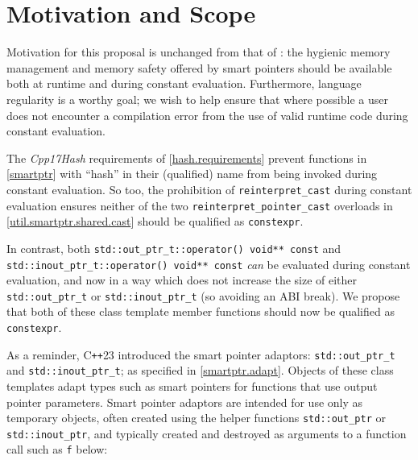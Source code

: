 \documentclass[10pt]{article}
\newcommand*{\wgxxi}[1]{[\href{https://wg21.link/#1}{#1}]}
\newcommand*{\Cpp}{C\texttt{++}}
\begin{document}

\section{Motivation and Scope}

Motivation for this proposal is unchanged from that of \cite{P3037R6}: the
hygienic memory management and memory safety offered by smart pointers should
be available both at runtime and during constant evaluation. Furthermore,
language regularity is a worthy goal; we wish to help ensure that where
possible a user does not encounter a compilation error from the use of valid
runtime code during constant evaluation.

The \emph{Cpp17Hash} requirements of \wgxxi{hash.requirements} prevent
functions in \wgxxi{smartptr} with ``hash'' in their (qualified) name from
being invoked during constant evaluation. So too, the prohibition of
\texttt{reinterpret\_cast} during constant evaluation ensures neither of the
two \texttt{reinterpret\_pointer\_cast} overloads in
\wgxxi{util.smartptr.shared.cast} should be qualified as \texttt{constexpr}.

In contrast, both \texttt{std::out\_ptr\_t::operator() void** const} and
\texttt{std::inout\_ptr\_t::operator() void** const} \emph{can} be
evaluated during constant evaluation, and now in a way which does not increase
the size of either \texttt{std::out\_ptr\_t} or \texttt{std::inout\_ptr\_t} (so
avoiding an ABI break). We propose that both of these class template member
functions should now be qualified as \texttt{constexpr}.

As a reminder, \Cpp{}23 introduced the smart pointer adaptors:
\texttt{std::out\_ptr\_t} and \texttt{std::inout\_ptr\_t}; as specified in
\wgxxi{smartptr.adapt}. Objects of these class templates adapt types such as
smart pointers for functions that use output pointer parameters. Smart pointer
adaptors are intended for use only as temporary objects, often created using
the helper functions \texttt{std::out\_ptr} or \texttt{std::inout\_ptr}, and
typically created and destroyed as arguments to a function call such as
\texttt{f} below:
\end{document}
